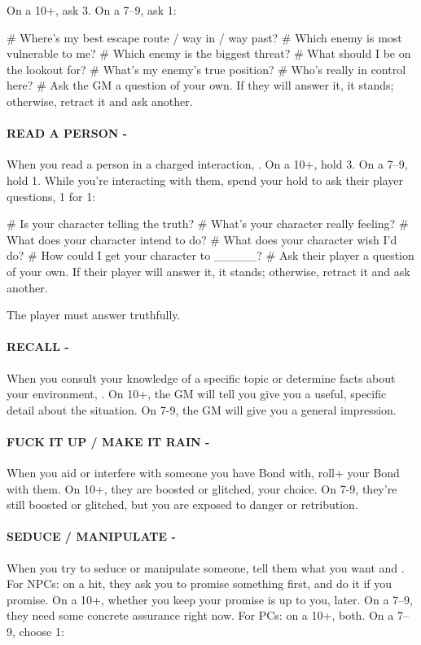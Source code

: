 On a 10+, ask 3. On a 7–9, ask 1:

\begin{easylist}
    # Where’s my best escape route / way in / way past?
    # Which enemy is most vulnerable to me?
    # Which enemy is the biggest threat?
    # What should I be on the lookout for?
    # What’s my enemy’s true position?
    # Who’s really in control here?
    # Ask the GM a question of your own. If they will answer it, it stands; otherwise, retract it and ask another.
\end{easylist}


\paragraph{READ A PERSON -} When you read a person in a charged interaction, . On a 10+, hold 3. On a 7–9, hold 1. While you’re interacting with them, spend your hold to ask their player questions, 1 for 1:

\begin{easylist}
    # Is your character telling the truth?
    # What’s your character really feeling?
    # What does your character intend to do?
    # What does your character wish I’d do?
    # How could I get your character to \_\_\_\_\_?
    # Ask their player a question of your own. If their player will answer it, it stands; otherwise, retract it and ask another.
\end{easylist}

The player must answer truthfully.


\paragraph{RECALL -} When you consult your knowledge of a specific topic or determine facts about your environment, . On 10+, the GM will tell you give you a useful, specific detail about the situation. On 7-9, the GM will give you a general impression.

\paragraph{FUCK IT UP / MAKE IT RAIN -} When you aid or interfere with someone you have Bond with, roll+ your Bond with them. On 10+, they are boosted or glitched, your choice. On 7-9, they’re still boosted or glitched, but you are exposed to danger or retribution.

\paragraph{SEDUCE / MANIPULATE -} When you try to seduce or manipulate someone, tell them what you want and .
For NPCs: on a hit, they ask you to promise something first, and do it if you promise. On a 10+, whether you keep your promise is up to you, later. On a 7–9, they need some concrete assurance right now.
For PCs: on a 10+, both. On a 7–9, choose 1:

